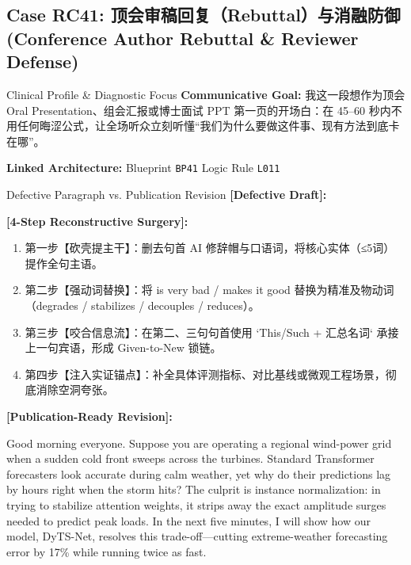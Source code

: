 \subsection{Case RC41: 顶会审稿回复（Rebuttal）与消融防御 (Conference Author Rebuttal \& Reviewer Defense)}\label{case:RC41}
\begin{ConceptBox}{Clinical Profile \& Diagnostic Focus}
\textbf{Communicative Goal:} 我这一段想作为顶会 Oral Presentation、组会汇报或博士面试 PPT 第一页的开场白：在 45--60 秒内不用任何晦涩公式，让全场听众立刻听懂“我们为什么要做这件事、现有方法到底卡在哪”。\par
\textbf{Linked Architecture:} Blueprint \texttt{BP41} \enspace\textbar\enspace Logic Rule \texttt{L011}
\end{ConceptBox}
\begin{ExampleBox}{Defective Paragraph vs. Publication Revision}
\textbf{\color{TargetHighlight}[Defective Draft]:}\par
{}\par\vspace{6pt}
\textbf{\color{AcadForest}[4-Step Reconstructive Surgery]:}
\begin{enumerate}[label=\textbf{\color{AcadNavy}Step \arabic*:}, leftmargin=2em]
  \item 第一步【砍壳提主干】：删去句首 AI 修辞帽与口语词，将核心实体（≤5词）提作全句主语。
  \item 第二步【强动词替换】：将 is very bad / makes it good 替换为精准及物动词（degrades / stabilizes / decouples / reduces）。
  \item 第三步【咬合信息流】：在第二、三句句首使用 `This/Such + 汇总名词` 承接上一句宾语，形成 Given-to-New 锁链。
  \item 第四步【注入实证锚点】：补全具体评测指标、对比基线或微观工程场景，彻底消除空洞夸张。
\end{enumerate}\vspace{4pt}
\textbf{\color{AcadNavy}[Publication-Ready Revision]:}\par
Good morning everyone. Suppose you are operating a regional wind-power grid when a sudden cold front sweeps across the turbines. Standard Transformer forecasters look accurate during calm weather, yet why do their predictions lag by hours right when the storm hits? The culprit is instance normalization: in trying to stabilize attention weights, it strips away the exact amplitude surges needed to predict peak loads. In the next five minutes, I will show how our model, DyTS-Net, resolves this trade-off---cutting extreme-weather forecasting error by 17\% while running twice as fast.
\end{ExampleBox}
